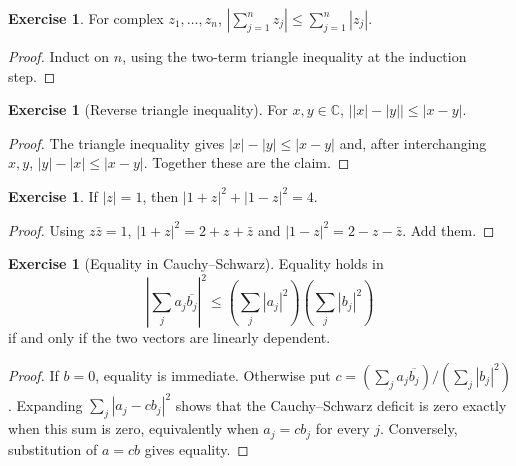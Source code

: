 \documentclass[12pt]{article}
\theoremstyle{definition}
\newtheorem{exercise}[theorem]{Exercise}
\newcommand{\C}{\mathbb C}
\begin{document}
\begin{exercise}
For complex $z_1,\ldots,z_n$,
$|\sum_{j=1}^n z_j|\le\sum_{j=1}^n|z_j|$.
\end{exercise}
\begin{proof}
Induct on $n$, using the two-term triangle inequality at the induction
step.
\end{proof}

\begin{exercise}[Reverse triangle inequality]
For $x,y\in\C$, $\bigl||x|-|y|\bigr|\le|x-y|$.
\end{exercise}
\begin{proof}
The triangle inequality gives $|x|-|y|\le|x-y|$ and, after interchanging
$x,y$, $|y|-|x|\le|x-y|$.  Together these are the claim.
\end{proof}

\begin{exercise}
If $|z|=1$, then $|1+z|^2+|1-z|^2=4$.
\end{exercise}
\begin{proof}
Using $z\bar z=1$,
$|1+z|^2=2+z+\bar z$ and $|1-z|^2=2-z-\bar z$.  Add them.
\end{proof}

\begin{exercise}[Equality in Cauchy--Schwarz]
Equality holds in
\[
 \left|\sum_j a_j\overline{b_j}\right|^2
 \le \left(\sum_j|a_j|^2\right)\left(\sum_j|b_j|^2\right)
\]
if and only if the two vectors are linearly dependent.
\end{exercise}
\begin{proof}
If $b=0$, equality is immediate.  Otherwise put
$c=(\sum_j a_j\overline{b_j})/(\sum_j|b_j|^2)$.  Expanding
$\sum_j|a_j-cb_j|^2$ shows that the Cauchy--Schwarz deficit is zero
exactly when this sum is zero, equivalently when $a_j=cb_j$ for every
$j$.  Conversely, substitution of $a=cb$ gives equality.
\end{proof}
\end{document}
